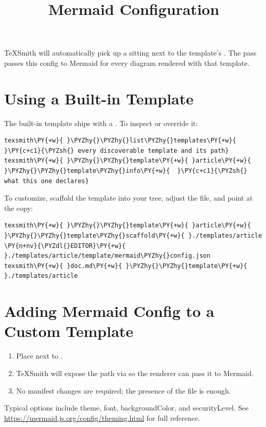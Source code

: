 \documentclass[a4paper,twoside]{article}
\title{Mermaid Configuration}
\author{}\date{}
\begin{document}
\maketitle
TeXSmith will automatically pick up a  sitting next to the template's . The  pass passes this config to Mermaid for every diagram rendered with that template.
\section{Using a Built-in Template}
The built-in  template ships with a . To inspect or override it:
\begin{tscode}[lang=bash, engine=pygments]
\begin{Verbatim}[commandchars=\\\{\},breaklines, breakanywhere, commandchars=\\\{\}]
texsmith\PY{+w}{ }\PYZhy{}\PYZhy{}list\PYZhy{}templates\PY{+w}{                    }\PY{c+c1}{\PYZsh{} every discoverable template and its path}
texsmith\PY{+w}{ }\PYZhy{}\PYZhy{}template\PY{+w}{ }article\PY{+w}{ }\PYZhy{}\PYZhy{}template\PYZhy{}info\PY{+w}{  }\PY{c+c1}{\PYZsh{} what this one declares}
\end{Verbatim}
\end{tscode}
To customize, scaffold the template into your tree, adjust the file, and point  at the copy:
\begin{tscode}[lang=bash, engine=pygments]
\begin{Verbatim}[commandchars=\\\{\},breaklines, breakanywhere, commandchars=\\\{\}]
texsmith\PY{+w}{ }\PYZhy{}\PYZhy{}template\PY{+w}{ }article\PY{+w}{ }\PYZhy{}\PYZhy{}template\PYZhy{}scaffold\PY{+w}{ }./templates/article
\PY{n+nv}{\PYZdl{}EDITOR}\PY{+w}{ }./templates/article/template/mermaid\PYZhy{}config.json
texsmith\PY{+w}{ }doc.md\PY{+w}{ }\PYZhy{}\PYZhy{}template\PY{+w}{ }./templates/article
\end{Verbatim}
\end{tscode}
\section{Adding Mermaid Config to a Custom Template}
\begin{enumerate}
\item Place  next to .
\item TeXSmith will expose the path via  so the renderer can pass it to Mermaid.
\item No manifest changes are required; the presence of the file is enough.
\end{enumerate}
Typical options include theme, font, backgroundColor, and securityLevel. See \url{https://mermaid.js.org/config/theming.html} for full reference.
\end{document}
